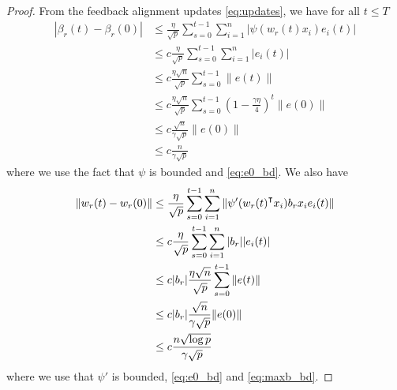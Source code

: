 \begin{proof}
From the feedback alignment updates \eqref{eq:updates}, we have for all $t\leq T$
\begin{equation*}
\begin{aligned}
    |\beta_r(t)-\beta_r(0)| &\leq \frac{\eta}{\sqrt p}\sum_{s=0}^{t-1}\sum_{i=1}^n |\psi(w_r(t)x_i)e_i(t)| \\
    &\leq c\frac{\eta}{\sqrt p}\sum_{s=0}^{t-1}\sum_{i=1}^n |e_i(t)| \\
    &\leq c\frac{\eta\sqrt n}{\sqrt p}\sum_{s=0}^{t-1} \|e(t)\| \\
    &\leq c\frac{\eta\sqrt n}{\sqrt p}\sum_{s=0}^{t-1}  (1-\frac{\gamma\eta}{4})^t\|e(0)\|  \\
    &\leq c\frac{\sqrt n}{\gamma\sqrt p}\|e(0)\| \\
    &\leq c\frac{n}{\gamma\sqrt p}
\end{aligned}
\end{equation*}
where we use the fact that $\psi$ is bounded and \eqref{eq:e0_bd}. We also have
\begin{equation*}
\begin{aligned}
    \|w_r(t)-w_r(0)\| &\leq \frac{\eta}{\sqrt p}\sum_{s=0}^{t-1}\sum_{i=1}^n \|\psi'(w_r(t)\transpose x_i)b_rx_i e_i(t)\| \\
    & \leq c\frac{\eta}{\sqrt p}\sum_{s=0}^{t-1}\sum_{i=1}^n |b_r| |e_i(t)| \\
    & \leq c|b_r|\frac{\eta\sqrt n}{\sqrt p}\sum_{s=0}^{t-1} \|e(t)\| \\
    & \leq c|b_r|\frac{\sqrt n}{\gamma\sqrt p}\|e(0)\| \\
    & \leq c\frac{n\sqrt{\log p}}{\gamma\sqrt p}
\end{aligned}
\end{equation*}
where we use that $\psi'$ is bounded, \eqref{eq:e0_bd} and \eqref{eq:maxb_bd}.
\end{proof}

